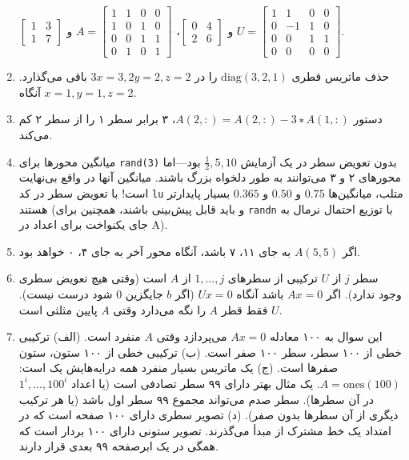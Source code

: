 \documentclass[12pt]{article}
\begin{document}
\begin{enumerate}
		$\begin{bmatrix} 1 & 3 \\ 1 & 7 \end{bmatrix}$ و $\begin{bmatrix} 0 & 4 \\ 2 & 6 \end{bmatrix}$،
		$A= \begin{bmatrix} 1 & 1 & 0 & 0 \\ 1 & 0 & 1 & 0 \\ 0 & 0 & 1 & 1 \\ 0 & 1 & 0 & 1 \end{bmatrix}$ و $U= \begin{bmatrix} 1 & 1 & 0 & 0 \\ 0 & -1 & 1 & 0 \\ 0 & 0 & 1 & 1 \\ 0 & 0 & 0 & 0 \end{bmatrix}$.
		\item حذف ماتریس قطری $\text{diag}(3,2,1)$ را در $3x=3, 2y=2, z=2$ باقی می‌گذارد. آنگاه $x=1, y=1, z=2$.
		\item دستور $A(2,:)=A(2,:)−3∗A(1,:)$، ۳ برابر سطر ۱ را از سطر ۲ کم می‌کند.
		\item میانگین محورها برای \texttt{rand(3)} بدون تعویض سطر در یک آزمایش $\frac{1}{2}, 5, 10$ بود—اما محورهای ۲ و ۳ می‌توانند به طور دلخواه بزرگ باشند. میانگین آنها در واقع بی‌نهایت است! با تعویض سطر در کد \texttt{lu} متلب، میانگین‌ها $0.75$ و $0.50$ و $0.365$ بسیار پایدارتر هستند (و باید قابل پیش‌بینی باشند، همچنین برای \texttt{randn} با توزیع احتمال نرمال به جای یکنواخت برای اعداد در A).
		\item اگر $A(5,5)$ به جای ۱۱، ۷ باشد، آنگاه محور آخر به جای ۴، ۰ خواهد بود.
		\item سطر $j$ از $U$ ترکیبی از سطرهای $1,...,j$ از $A$ است (وقتی هیچ تعویض سطری وجود ندارد). اگر $Ax=0$ باشد آنگاه $Ux=0$ (اگر $b$ جایگزین $0$ شود درست نیست). $U$ فقط قطر $A$ را نگه می‌دارد وقتی $A$ پایین مثلثی است.
		\item این سوال به ۱۰۰ معادله $Ax=0$ می‌پردازد وقتی $A$ منفرد است.
		(الف) ترکیبی خطی از ۱۰۰ سطر، سطر ۱۰۰ صفر است.
		(ب) ترکیبی خطی از ۱۰۰ ستون، ستون صفرها است.
		(ج) یک ماتریس بسیار منفرد همه درایه‌هایش یک است: $A=\text{ones}(100)$. یک مثال بهتر دارای ۹۹ سطر تصادفی است (یا اعداد $1^i,...,100^i$ در آن سطرها). سطر صدم می‌تواند مجموع ۹۹ سطر اول باشد (یا هر ترکیب دیگری از آن سطرها بدون صفر).
		(د) تصویر سطری دارای ۱۰۰ صفحه است که در امتداد یک خط مشترک از مبدأ می‌گذرند. تصویر ستونی دارای ۱۰۰ بردار است که همگی در یک ابرصفحه ۹۹ بعدی قرار دارند.
		
	\end{enumerate}
	
\end{document}
